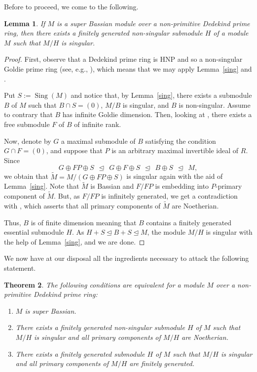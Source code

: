 \documentclass{amsart}
\newtheorem{thm}{Theorem}[section]
\newtheorem{lm}[thm]{Lemma}
\theoremstyle{definition}
\DeclareMathOperator{\Sing}{{Sing}}
\begin{document}
Before to proceed, we come to the following.

\begin{lm}\label{f.g.submodule} If $M$ is a super Bassian module over a non-primitive Dedekind prime ring, then there exists a finitely generated non-singular submodule $H$ of a module $M$ such that $M/H$ is singular.
\end{lm}

\begin{proof} First, observe that a Dedekind prime ring is HNP and so a non-singular Goldie prime ring (see, e.g., \cite[Remark 2]{T}), which means that we may apply Lemma~\ref{sing} and \cite[Lemma 4]{T}.

Put $S:=\Sing(M)$ and notice that, by Lemma~\ref{sing}, there exists a submodule $B$ of $M$ such that $B\cap S=(0)$, $M/B$ is singular, and $B$ is non-singular. Assume to contrary that $B$ has infinite Goldie dimension. Then, looking at \cite[Lemma 4.3]{T}, there exists a free submodule $F$ of $B$ of infinite rank.

Now, denote by $G$ a maximal submodule of $B$ satisfying the condition $G\cap F=(0)$, and suppose that $P$ is an arbitrary maximal invertible ideal of $R$. Since
\[
G\oplus FP\oplus S\ \ \trianglelefteq\ \  G\oplus F\oplus S\ \  \trianglelefteq\ \  B\oplus S\ \  \trianglelefteq\ \  M,
\]
we obtain that $\tilde{M}=M/(G\oplus FP\oplus S)$ is singular again with the aid of Lemma~\ref{sing}. Note that $\tilde{M}$ is Bassian and $F/FP$ is embedding into $P$-primary component of $\tilde{M}$. But, as $F/FP$ is infinitely generated, we get a contradiction with \cite[Theorem 1]{T}, which asserts that all primary components of $\tilde{M}$ are Noetherian.

Thus, $B$ is of finite dimension meaning that $B$ contains a finitely generated essential submodule $H$. As $H+S\trianglelefteq B+S\trianglelefteq M$, the module $M/H$ is singular with the help of Lemma~\ref{sing}, and we are done.
\end{proof}

We now have at our disposal all the ingredients necessary to attack the following statement.

\begin{thm}\label{super Bassian}
The following conditions are equivalent for a module $M$ over a non-primitive Dedekind prime ring:
\begin{enumerate}
\item[(1)] $M$ is super Bassian.
\item[(2)] There exists a finitely generated non-singular submodule $H$ of $M$ such that $M/H$ is singular and all primary components of $M/H$ are Noetherian.
\item[(3)] There exists a finitely generated submodule $H$ of $M$ such that $M/H$ is singular and all primary components of $M/H$ are finitely generated.
\end{enumerate}
\end{thm}
\end{document}
